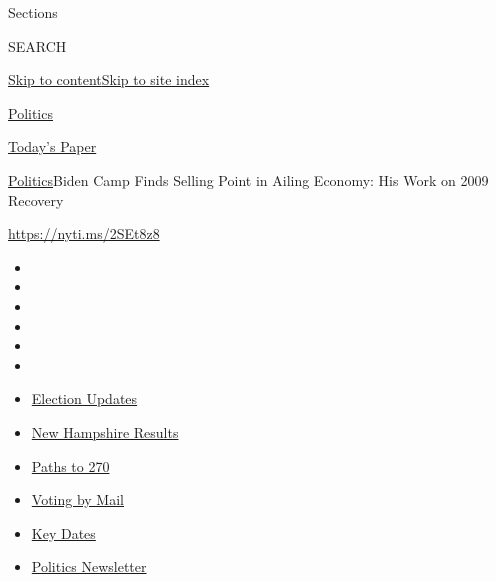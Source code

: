 Sections

SEARCH

\protect\hyperlink{site-content}{Skip to
content}\protect\hyperlink{site-index}{Skip to site index}

\href{https://www.nytimes3xbfgragh.onion/section/politics}{Politics}

\href{https://myaccount.nytimes3xbfgragh.onion/auth/login?response_type=cookie\&client_id=vi}{}

\href{https://www.nytimes3xbfgragh.onion/section/todayspaper}{Today's
Paper}

\href{/section/politics}{Politics}\textbar{}Biden Camp Finds Selling
Point in Ailing Economy: His Work on 2009 Recovery

\url{https://nyti.ms/2SEt8z8}

\begin{itemize}
\item
\item
\item
\item
\item
\item
\end{itemize}

\begin{itemize}
\item
  \href{https://www.nytimes3xbfgragh.onion/live/2020/09/09/us/trump-vs-biden?action=click\&pgtype=Article\&state=default\&region=TOP_BANNER\&context=storylines_menu}{Election
  Updates}
\item
  \href{https://www.nytimes3xbfgragh.onion/interactive/2020/09/08/us/elections/results-new-hampshire-primary-elections.html?action=click\&pgtype=Article\&state=default\&region=TOP_BANNER\&context=storylines_menu}{New
  Hampshire Results}
\item
  \href{https://www.nytimes3xbfgragh.onion/interactive/2020/us/elections/election-states-biden-trump.html?action=click\&pgtype=Article\&state=default\&region=TOP_BANNER\&context=storylines_menu}{Paths
  to 270}
\item
  \href{https://www.nytimes3xbfgragh.onion/interactive/2020/08/31/us/politics/vote-by-mail-deadlines.html?action=click\&pgtype=Article\&state=default\&region=TOP_BANNER\&context=storylines_menu}{Voting
  by Mail}
\item
  \href{https://www.nytimes3xbfgragh.onion/interactive/2019/us/elections/2020-presidential-election-calendar.html?action=click\&pgtype=Article\&state=default\&region=TOP_BANNER\&context=storylines_menu}{Key
  Dates}
\item
  \href{https://www.nytimes3xbfgragh.onion/newsletters/politics?action=click\&pgtype=Article\&state=default\&region=TOP_BANNER\&context=storylines_menu}{Politics
  Newsletter}
\end{itemize}

